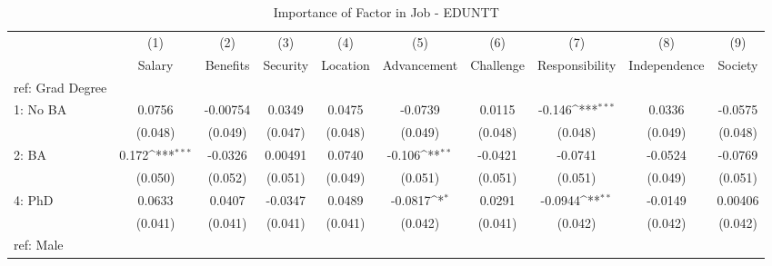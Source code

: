 \begin{table}[htbp]\centering
\def\sym#1{\ifmmode^{#1}\else\(^{#1}\)\fi}
\caption{Importance of Factor in Job - EDUNTT \label{tab1}}
\begin{tabular}{l*{9}{c}}
\hline\hline
  &\multicolumn{1}{c}{(1)}&\multicolumn{1}{c}{(2)}&\multicolumn{1}{c}{(3)}&\multicolumn{1}{c}{(4)}&\multicolumn{1}{c}{(5)}&\multicolumn{1}{c}{(6)}&\multicolumn{1}{c}{(7)}&\multicolumn{1}{c}{(8)}&\multicolumn{1}{c}{(9)}\\
  &\multicolumn{1}{c}{Salary}&\multicolumn{1}{c}{Benefits}&\multicolumn{1}{c}{Security}&\multicolumn{1}{c}{Location}&\multicolumn{1}{c}{Advancement}&\multicolumn{1}{c}{Challenge}&\multicolumn{1}{c}{Responsibility}&\multicolumn{1}{c}{Independence}&\multicolumn{1}{c}{Society}\\
\hline
ref: Grad Degree&                     &                     &                     &                     &                     &                     &                     &                     &                     \\
[1em]
1: No BA&      0.0756         &    -0.00754         &      0.0349         &      0.0475         &     -0.0739         &      0.0115         &      -0.146\sym{***}&      0.0336         &     -0.0575         \\
  &     (0.048)         &     (0.049)         &     (0.047)         &     (0.048)         &     (0.049)         &     (0.048)         &     (0.048)         &     (0.049)         &     (0.048)         \\
[1em]
2: BA&       0.172\sym{***}&     -0.0326         &     0.00491         &      0.0740         &      -0.106\sym{**} &     -0.0421         &     -0.0741         &     -0.0524         &     -0.0769         \\
  &     (0.050)         &     (0.052)         &     (0.051)         &     (0.049)         &     (0.051)         &     (0.051)         &     (0.051)         &     (0.049)         &     (0.051)         \\
[1em]
4: PhD&      0.0633         &      0.0407         &     -0.0347         &      0.0489         &     -0.0817\sym{*}  &      0.0291         &     -0.0944\sym{**} &     -0.0149         &     0.00406         \\
  &     (0.041)         &     (0.041)         &     (0.041)         &     (0.041)         &     (0.042)         &     (0.041)         &     (0.042)         &     (0.042)         &     (0.042)         \\
[1em]
ref: Male&                     &                     &                     &                     &                     &                     &                     &                     &                     \\

\end{tabular}
\end{table}
